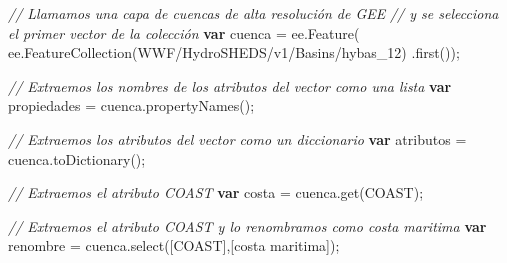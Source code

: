 \documentclass[
  12pt,
  letterpaper,
  twoside]{book}
\newenvironment{Shaded}{\begin{snugshade}}{\end{snugshade}}
\newcommand{\CommentTok}[1]{\textcolor[rgb]{0.24,0.58,0.00}{\textit{#1}}}
\newcommand{\ControlFlowTok}[1]{\textcolor[rgb]{0.00,0.00,0.00}{\textbf{#1}}}
\newcommand{\FunctionTok}[1]{\textcolor[rgb]{0.48,0.12,0.64}{#1}}
\newcommand{\KeywordTok}[1]{\textcolor[rgb]{0.48,0.12,0.64}{#1}}
\newcommand{\NormalTok}[1]{#1}
\newcommand{\OperatorTok}[1]{\textcolor[rgb]{0.00,0.00,0.00}{#1}}
\newcommand{\StringTok}[1]{\textcolor[rgb]{0.87,0.29,0.22}{#1}}
\begin{document}
\begin{Shaded}
\begin{Highlighting}[]
\CommentTok{// Llamamos una capa de cuencas de alta resolución de GEE}
\CommentTok{// y se selecciona el primer vector de la colección}
\ControlFlowTok{var}\NormalTok{ cuenca }\OperatorTok{=} \KeywordTok{ee}\OperatorTok{.}\FunctionTok{Feature}\NormalTok{(}
  \KeywordTok{ee}\OperatorTok{.}\FunctionTok{FeatureCollection}\NormalTok{(}\StringTok{\textquotesingle{}WWF/HydroSHEDS/v1/Basins/hybas\_12\textquotesingle{}}\NormalTok{)}
  \OperatorTok{.}\FunctionTok{first}\NormalTok{())}\OperatorTok{;}

\CommentTok{// Extraemos los nombres de los atributos del vector como una lista}
\ControlFlowTok{var}\NormalTok{ propiedades }\OperatorTok{=}\NormalTok{ cuenca}\OperatorTok{.}\FunctionTok{propertyNames}\NormalTok{()}\OperatorTok{;}

\CommentTok{// Extraemos los atributos del vector como un diccionario}
\ControlFlowTok{var}\NormalTok{ atributos }\OperatorTok{=}\NormalTok{ cuenca}\OperatorTok{.}\FunctionTok{toDictionary}\NormalTok{()}\OperatorTok{;}

\CommentTok{// Extraemos el atributo \textquotesingle{}COAST\textquotesingle{}}
\ControlFlowTok{var}\NormalTok{ costa }\OperatorTok{=}\NormalTok{ cuenca}\OperatorTok{.}\FunctionTok{get}\NormalTok{(}\StringTok{\textquotesingle{}COAST\textquotesingle{}}\NormalTok{)}\OperatorTok{;}

\CommentTok{// Extraemos el atributo \textquotesingle{}COAST\textquotesingle{} y lo renombramos como \textquotesingle{}costa maritima\textquotesingle{}}
\ControlFlowTok{var}\NormalTok{ renombre }\OperatorTok{=}\NormalTok{ cuenca}\OperatorTok{.}\FunctionTok{select}\NormalTok{([}\StringTok{\textquotesingle{}COAST\textquotesingle{}}\NormalTok{]}\OperatorTok{,}\NormalTok{[}\StringTok{\textquotesingle{}costa maritima\textquotesingle{}}\NormalTok{])}\OperatorTok{;}
\end{Highlighting}
\end{Shaded}
\end{document}
